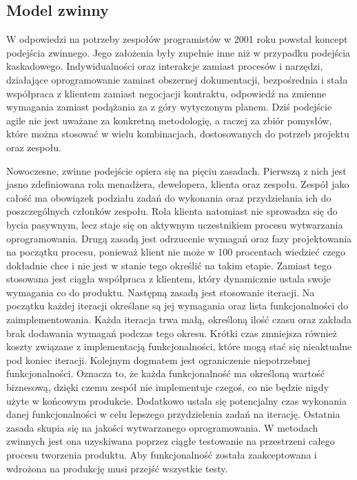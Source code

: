\subsection{Model zwinny}
\label{subsec:modelZwinny}
W odpowiedzi na potrzeby zespołów programistów w 2001 roku powstał koncept
podejścia zwinnego. Jego założenia były zupełnie inne niż w przypadku podejścia
kaskadowego. Indywidualności oraz interakcje zamiast procesów i narzędzi, działające
oprogramowanie zamiast obszernej dokumentacji, bezpośrednia i stała współpraca z klientem
zamiast negocjacji kontraktu, odpowiedź na zmienne wymagania zamiast podążania za z góry
wytyczonym planem. Dziś podejście agile nie jest uważane za konkretną metodologię,
a raczej za zbiór pomysłów, które można stosować w wielu kombinacjach, dostosowanych do
potrzeb projektu oraz zespołu.


Nowoczesne, zwinne podejście opiera się na pięciu zasadach. Pierwszą z nich jest
jasno zdefiniowana rola menadżera, dewelopera, klienta oraz zespołu. Zespół jako całość ma
obowiązek podziału zadań do wykonania oraz przydzielania ich do poszczególnych członków zespołu. Rola
klienta natomiast nie sprowadza się do bycia pasywnym, lecz staje się on aktywnym
uczestnikiem procesu wytwarzania oprogramowania. Drugą zasadą jest odrzucenie wymagań
oraz fazy projektowania na początku procesu, ponieważ klient nie może w 100 procentach wiedzieć czego dokładnie chce i
nie jest w stanie tego określić na takim etapie. Zamiast tego stosowana jest ciągła współpraca
z klientem, który dynamicznie ustala swoje wymagania co do produktu. Następną zasadą jest
stosowanie iteracji. Na początku każdej iteracji określane są jej wymagania oraz lista
funkcjonalności do zaimplementowania. Każda iteracja trwa małą, określoną ilość czasu oraz
zakłada brak dodawania wymagań podczas tego okresu. Krótki czas zmniejsza również
koszty związane z implementacją funkcjonalności, które mogą stać się nieaktualne pod koniec
iteracji. Kolejnym dogmatem jest ograniczenie niepotrzebnej funkcjonalności. Oznacza to, że
każda funkcjonalność ma określoną wartość biznesową, dzięki czemu zespół nie
implementuje czegoś, co nie będzie nigdy użyte w końcowym produkcie. Dodatkowo ustala
się potencjalny czas wykonania danej funkcjonalności w celu lepszego przydzielenia zadań na
iterację. Ostatnia zasada skupia się na jakości wytwarzanego oprogramowania. W metodach
zwinnych jest ona uzyskiwana poprzez ciągłe testowanie na przestrzeni całego procesu
tworzenia produktu. Aby funkcjonalność została zaakceptowana i wdrożona na produkcję
musi przejść wszystkie testy.

